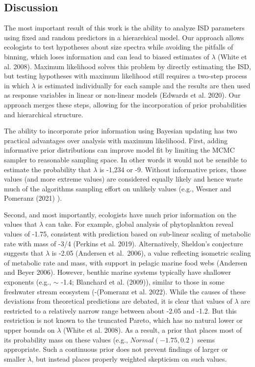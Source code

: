 \documentclass[
  12pt,
]{article}
\numberwithin{equation}
\begin{document}
\hypertarget{discussion}{%
\subsection{Discussion}\label{discussion}}

The most important result of this work is the ability to analyze ISD
parameters using fixed and random predictors in a hierarchical model.
Our approach allows ecologists to test hypotheses about size spectra
while avoiding the pitfalls of binning, which loses information and can
lead to biased estimates of \(\lambda\) (White et al. 2008). Maximum
likelihood solves this problem by directly estimating the ISD, but
testing hypotheses with maximum likelihood still requires a two-step
process in which \(\lambda\) is estimated individually for each sample
and the results are then used as response variables in linear or
non-linear models (Edwards et al. 2020). Our approach merges these
steps, allowing for the incorporation of prior probabilities and
hierarchical structure.

The ability to incorporate prior information using Bayesian updating has
two practical advantages over analysis with maximum likelihood. First,
adding informative prior distributions can improve model fit by limiting
the MCMC sampler to reasonable sampling space. In other words it would
not be sensible to estimate the probability that \(\lambda\) is -1,234
or -9. Without informative priors, those values (and more extreme
values) are considered equally likely and hence waste much of the
algorithms sampling effort on unlikely values (e.g., Wesner and Pomeranz
(2021) ).

Second, and most importantly, ecologists have much prior information on
the values that \(\lambda\) can take. For example, global analysis of
phytoplankton reveal values of -1.75, consistent with prediction based
on sub-linear scaling of metabolic rate with mass of -3/4 (Perkins et
al. 2019). Alternatively, Sheldon's conjecture suggests that \(\lambda\)
is -2.05 (Andersen et al.~2006), a value reflecting isometric scaling of
metabolic rate and mass, with support in pelagic marine food webs
(Andersen and Beyer 2006). However, benthic marine systems typically
have shallower exponents (e.g., \(\sim\) -1.4; Blanchard et al. (2009)),
similar to those in some freshwater stream ecosystem (-(Pomeranz et al.
2022). While the causes of these deviations from theoretical predictions
are debated, it is clear that values of \(\lambda\) are restricted to a
relatively narrow range between about -2.05 and -1.2. But this
restriction is not known to the truncated Pareto, which has no natural
lower or upper bounds on \(\lambda\) (White et al. 2008). As a result, a
prior that places most of its probability mass on these values (e.g.,
\(Normal(-1.75, 0.2)\) seems appropriate. Such a continuous prior does
not prevent findings of larger or smaller \(\lambda\), but instead
places properly weighted skepticism on such values.
\end{document}
